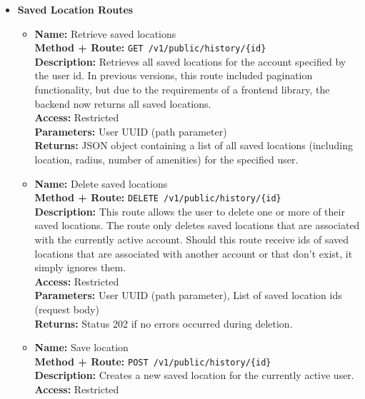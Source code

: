 \begin{itemize}
{  }
  \item{
    \textbf{Saved Location Routes}
    \begin{itemize}
      \item {
        \textbf{Name:} Retrieve saved locations\\
        \textbf{Method + Route:} \texttt{GET /v1/public/history/\{id\}}\\
        \textbf{Description:} Retrieves all saved locations for the account
        specified by the user id. In previous versions, this route included
        pagination functionality, but due to the requirements of a frontend
        library, the backend now returns all saved locations.\\
        \textbf{Access:} Restricted\\
        \textbf{Parameters:} User UUID (path parameter)\\
        \textbf{Returns:} JSON object containing a list of all saved locations
        (including location, radius, number of amenities) for the specified
        user.\\
      }
      \item {
        \textbf{Name:} Delete saved locations\\
        \textbf{Method + Route:} \texttt{DELETE /v1/public/history/\{id\}}\\
        \textbf{Description:} This route allows the user to delete one or more
        of their saved locations. The route only deletes saved locations that
        are associated with the currently active account. Should this route
        receive ids of saved locations that are associated with another account
        or that don't exist, it simply ignores them.\\
        \textbf{Access:} Restricted\\
        \textbf{Parameters:} User UUID (path parameter), List of saved location
        ids (request body)\\
        \textbf{Returns:} Status 202 if no errors occurred during deletion.\\
      }
      \item {
        \textbf{Name:} Save location\\
        \textbf{Method + Route:} \texttt{POST /v1/public/history/\{id\}}\\
        \textbf{Description:} Creates a new saved location for the currently
        active user.\\
        \textbf{Access:} Restricted\\
}
\end{itemize}}
\end{itemize}
